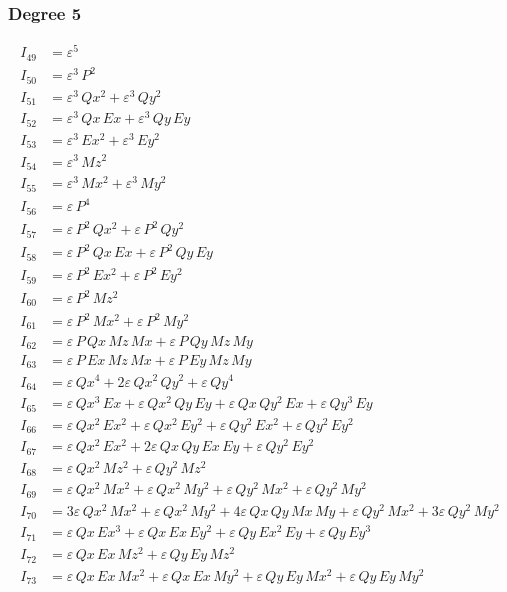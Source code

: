 \documentclass{article}
\begin{document}
\subsubsection*{Degree 5}

\begin{align*}
I_{49} &= ε^{5} \\
I_{50} &= ε^{3}\,P^{2} \\
I_{51} &= ε^{3}\,Qx^{2} + ε^{3}\,Qy^{2} \\
I_{52} &= ε^{3}\,Qx\,Ex + ε^{3}\,Qy\,Ey \\
I_{53} &= ε^{3}\,Ex^{2} + ε^{3}\,Ey^{2} \\
I_{54} &= ε^{3}\,Mz^{2} \\
I_{55} &= ε^{3}\,Mx^{2} + ε^{3}\,My^{2} \\
I_{56} &= ε\,P^{4} \\
I_{57} &= ε\,P^{2}\,Qx^{2} + ε\,P^{2}\,Qy^{2} \\
I_{58} &= ε\,P^{2}\,Qx\,Ex + ε\,P^{2}\,Qy\,Ey \\
I_{59} &= ε\,P^{2}\,Ex^{2} + ε\,P^{2}\,Ey^{2} \\
I_{60} &= ε\,P^{2}\,Mz^{2} \\
I_{61} &= ε\,P^{2}\,Mx^{2} + ε\,P^{2}\,My^{2} \\
I_{62} &= ε\,P\,Qx\,Mz\,Mx + ε\,P\,Qy\,Mz\,My \\
I_{63} &= ε\,P\,Ex\,Mz\,Mx + ε\,P\,Ey\,Mz\,My \\
I_{64} &= ε\,Qx^{4} + 2ε\,Qx^{2}\,Qy^{2} + ε\,Qy^{4} \\
I_{65} &= ε\,Qx^{3}\,Ex + ε\,Qx^{2}\,Qy\,Ey + ε\,Qx\,Qy^{2}\,Ex + ε\,Qy^{3}\,Ey \\
I_{66} &= ε\,Qx^{2}\,Ex^{2} + ε\,Qx^{2}\,Ey^{2} + ε\,Qy^{2}\,Ex^{2} + ε\,Qy^{2}\,Ey^{2} \\
I_{67} &= ε\,Qx^{2}\,Ex^{2} + 2ε\,Qx\,Qy\,Ex\,Ey + ε\,Qy^{2}\,Ey^{2} \\
I_{68} &= ε\,Qx^{2}\,Mz^{2} + ε\,Qy^{2}\,Mz^{2} \\
I_{69} &= ε\,Qx^{2}\,Mx^{2} + ε\,Qx^{2}\,My^{2} + ε\,Qy^{2}\,Mx^{2} + ε\,Qy^{2}\,My^{2} \\
I_{70} &= 3ε\,Qx^{2}\,Mx^{2} + ε\,Qx^{2}\,My^{2} + 4ε\,Qx\,Qy\,Mx\,My + ε\,Qy^{2}\,Mx^{2} + 3ε\,Qy^{2}\,My^{2} \\
I_{71} &= ε\,Qx\,Ex^{3} + ε\,Qx\,Ex\,Ey^{2} + ε\,Qy\,Ex^{2}\,Ey + ε\,Qy\,Ey^{3} \\
I_{72} &= ε\,Qx\,Ex\,Mz^{2} + ε\,Qy\,Ey\,Mz^{2} \\
I_{73} &= ε\,Qx\,Ex\,Mx^{2} + ε\,Qx\,Ex\,My^{2} + ε\,Qy\,Ey\,Mx^{2} + ε\,Qy\,Ey\,My^{2} \\

\end{align*}
\end{document}
